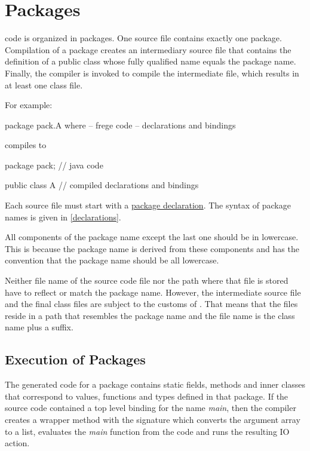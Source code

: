 

\chapter{Packages} \label{packages} 

\frege{} code is organized in packages. One source file contains
exactly one package. Compilation of a package creates an  intermediary \java{}
source file that contains the definition of a public class whose fully qualified name equals the \frege{} package name. Finally, the \java{} compiler is invoked to compile the intermediate file, which results in at least one class file.

For example:

\begin{code}
package pack.A where  -- frege code
-- declarations and bindings
\end{code}

compiles to

\begin{code}
package pack;        // java code

public class A {
    // compiled declarations and bindings
}
\end{code}


Each source file must start with a \hyperref[packagedcl]{package declaration}.
The syntax of package names is given in \autoref{declarations}.

All components of the package name
except the last one should be in lowercase. This is because the \java{}
package name is derived from these components and \java{} has the
convention that the package name should be all lowercase.

Neither file name of the \frege{} source code file nor the path where that file is stored have to reflect or match the package name. However, the intermediate \java{} source file and the final class files are subject to the customs of \java{}. That means that the files reside in a path that resembles the package name and the file name is the class name plus a suffix.

\section{Execution of \frege{} Packages} \label{execution}

The generated \java{} code for a \frege{} package contains static fields, methods and inner classes that correspond to \frege{} values, functions and types defined in that package. If the source code contained a top level binding for the name \emph{main}, then the compiler creates a wrapper method with the signature 
which converts the argument array to a list, evaluates the \emph{main} function from the \frege{} code and runs the resulting IO action. 

